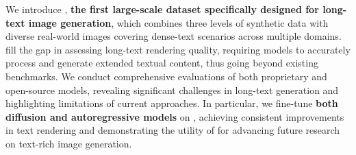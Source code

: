  We introduce \DatasetName, \textbf{the first large-scale dataset specifically designed for long-text image generation}, which combines three levels of synthetic data with diverse real-world images covering dense-text scenarios across multiple domains. 
 \EvalDatasetName fill the gap in assessing long-text rendering quality, requiring models to accurately process and generate extended textual content, thus going beyond existing benchmarks. 
 We conduct comprehensive evaluations of both proprietary and open-source models, revealing significant challenges in long-text generation and highlighting limitations of current approaches. 
In particular, we fine-tune \textbf{both diffusion and autoregressive models} on \DatasetName, achieving consistent improvements in text rendering and demonstrating the  utility  of \DatasetName for advancing future research on text-rich image generation.







